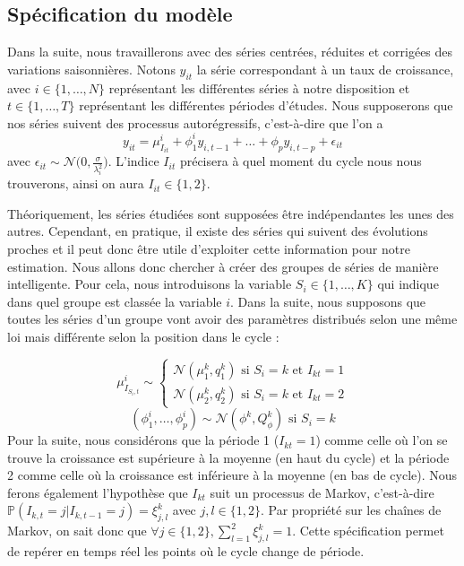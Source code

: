 \documentclass[10pt,french,french]{article}
\begin{document}
\hypertarget{spuxe9cification-du-moduxe8le}{%
\subsection{Spécification du modèle}\label{spuxe9cification-du-moduxe8le}}

Dans la suite, nous travaillerons avec des séries centrées, réduites et corrigées des variations saisonnières.
Notons \(y_{it}\) la série correspondant à un taux de croissance, avec \(i \in \{1, \dots, N\}\) représentant les différentes séries à notre disposition et \(t \in \{1, \dots, T\}\) représentant les différentes périodes d'études.
Nous supposerons que nos séries suivent des processus autorégressifs, c'est-à-dire que l'on a \[ y_{it} = \mu_{I_{it}}^{i} + \phi_1^i y_{i,t-1} + \dots + \phi_p y_{i,t-p} + \epsilon_{it}\] avec \(\epsilon_{it} \sim \mathcal{N}\big(0, \displaystyle\frac{\sigma}{\lambda_i^2}\big)\).
L'indice \(I_{it}\) précisera à quel moment du cycle nous nous trouverons, ainsi on aura \(I_{it} \in \{1,2\}\).

Théoriquement, les séries étudiées sont supposées être indépendantes les unes des autres.
Cependant, en pratique, il existe des séries qui suivent des évolutions proches et il peut donc être utile d'exploiter cette information pour notre estimation.
Nous allons donc chercher à créer des groupes de séries de manière intelligente.
Pour cela, nous introduisons la variable \(S_i \in \{1, \dots, K \}\) qui indique dans quel groupe est classée la variable \(i\).
Dans la suite, nous supposons que toutes les séries d'un groupe vont avoir des paramètres distribués selon une même loi mais différente selon la position dans le cycle :

\[ \mu_{I_{S_i,t}}^i \sim \begin{cases}
\mathcal{N}(\mu_1^k,q_1^k) \text{ si } S_i = k \text{ et } I_{kt} = 1\\
\mathcal{N}(\mu_2^k,q_2^k) \text{ si } S_i = k \text{ et } I_{kt} = 2
\end{cases} \] \[ (\phi_1^i, \dots, \phi_p^i) \sim \mathcal{N}(\phi^k,Q_{\phi}^k) \text{ si } S_i = k\] Pour la suite, nous considérons que la période 1 (\(I_{kt} = 1\)) comme celle où l'on se trouve la croissance est supérieure à la moyenne (en haut du cycle) et la période 2 comme celle où la croissance est inférieure à la moyenne (en bas de cycle).
Nous ferons également l'hypothèse que \(I_{kt}\) suit un processus de Markov, c'est-à-dire \(\mathbb{P}(I_{k,t} = j | I_{k,t-1} = j) = \xi_{j,l}^k\) avec \(j,l \in \{1,2\}\).
Par propriété sur les chaînes de Markov, on sait donc que \(\forall j \in \{1,2\}, \sum\limits_{l=1}^2 \xi_{j,l}^k = 1\).
Cette spécification permet de repérer en temps réel les points où le cycle change de période.
\end{document}
